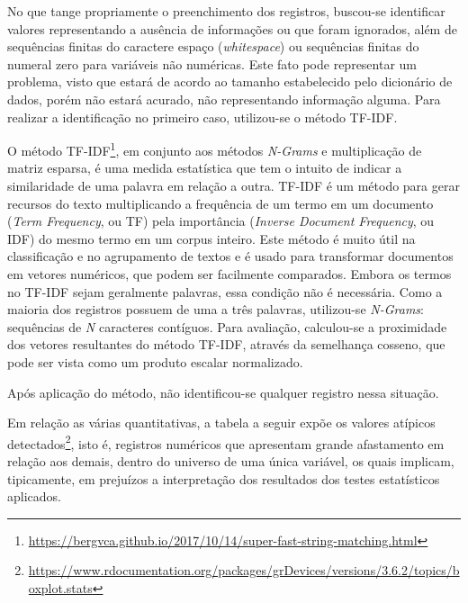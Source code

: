 \documentclass[
  12,
  table]{proadi}
\begin{document}
No que tange propriamente o preenchimento dos registros, buscou-se
identificar valores representando a ausência de informações ou que foram
ignorados, além de sequências finitas do caractere espaço
(\emph{whitespace}) ou sequências finitas do numeral zero para variáveis
não numéricas. Este fato pode representar um problema, visto que estará
de acordo ao tamanho estabelecido pelo dicionário de dados, porém não
estará acurado, não representando informação alguma. Para realizar a
identificação no primeiro caso, utilizou-se o método TF-IDF.

O método TF-IDF\footnote{\url{https://bergvca.github.io/2017/10/14/super-fast-string-matching.html}},
em conjunto aos métodos \emph{N-Grams} e multiplicação de matriz
esparsa, é uma medida estatística que tem o intuito de indicar a
similaridade de uma palavra em relação a outra. TF-IDF é um método para
gerar recursos do texto multiplicando a frequência de um termo em um
documento (\emph{Term Frequency}, ou TF) pela importância (\emph{Inverse
Document Frequency}, ou IDF) do mesmo termo em um corpus inteiro. Este
método é muito útil na classificação e no agrupamento de textos e é
usado para transformar documentos em vetores numéricos, que podem ser
facilmente comparados. Embora os termos no TF-IDF sejam geralmente
palavras, essa condição não é necessária. Como a maioria dos registros
possuem de uma a três palavras, utilizou-se \emph{N-Grams}: sequências
de \emph{N} caracteres contíguos. Para avaliação, calculou-se a
proximidade dos vetores resultantes do método TF-IDF, através da
semelhança cosseno, que pode ser vista como um produto escalar
normalizado.

Após aplicação do método, não identificou-se qualquer registro nessa
situação.

Em relação as várias quantitativas, a tabela a seguir expõe os valores
atípicos detectados\footnote{\url{https://www.rdocumentation.org/packages/grDevices/versions/3.6.2/topics/boxplot.stats}},
isto é, registros numéricos que apresentam grande afastamento em relação
aos demais, dentro do universo de uma única variável, os quais implicam,
tipicamente, em prejuízos a interpretação dos resultados dos testes
estatísticos aplicados.

\begingroup\fontsize{10}{12}\selectfont
\end{document}
